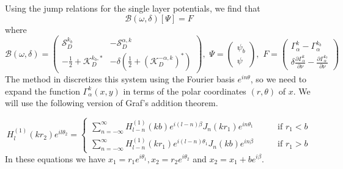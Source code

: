 \documentclass[a4paper]{article}
\theoremstyle{definition}
\newcommand{\B}{\mathcal{B}}
\renewcommand{\S}{\mathcal{S}}
\newcommand{\K}{\mathcal{K}}
\begin{document}
Using the jump relations for the single layer potentials, we find that
\begin{equation*}
\B(\omega,\delta)[\Psi] = F
\end{equation*}
where 
\begin{equation*}
\B(\omega, \delta) = 
\begin{pmatrix}
\S_D^{k_b} &  -\S_D^{\alpha,k}  \\
-\frac{1}{2}+ \K_D^{k_b, *}& -\delta( \frac{1}{2}+ (\K_D^{ -\alpha,k})^*)
\end{pmatrix}, 
\,\, \Psi= 
\begin{pmatrix}
\psi_b\\
\psi
\end{pmatrix},
\,\, F=
\begin{pmatrix}
\Gamma_\alpha^{k} - \Gamma_\alpha^{k_b} \\
\delta\frac{\partial \Gamma_\alpha^{k}}{\partial \nu} -
\frac{\partial \Gamma_\alpha^{k_b}}{\partial \nu} 
\end{pmatrix}
\end{equation*}
The method in \cite{bandgap} discretizes this system using the Fourier basis $e^{in\theta}$, so  we need to expand the function $\Gamma_\alpha^k(x,y)$ in terms of the polar coordinates $(r,\theta)$ of $x$. We will use the following version of Graf's addition theorem.

\begin{equation*}
H_l^{(1)}(kr_2)e^{il\theta_2} =
\begin{cases}
\sum_{n=-\infty}^\infty H_{l-n}^{(1)}(kb)e^{i(l-n)\beta}J_n(kr_1)e^{in\theta_1} \qquad &\text{if } r_1<b \\
\sum_{n=-\infty}^\infty H_{l-n}^{(1)}(kr_1)e^{i(l-n)\theta_1}J_n(kb)e^{in\beta} \qquad &\text{if } r_1>b
\end{cases}
\end{equation*}
In these equations we have $x_1 = r_1e^{i\theta_1}, x_2 = r_2e^{i\theta_2}$ and $x_2 = x_1 + be^{i\beta}$. 
\end{document}
